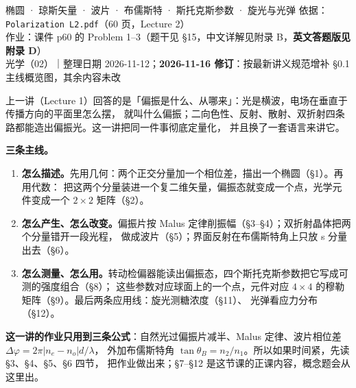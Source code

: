 \documentclass[11pt]{ctexart}
\let\subhdrtheme\subhdr
\renewcommand{\subhdr}[1]{\needspace{4\baselineskip}\subhdrtheme{#1}}
\let\hdrorig\hdr
\renewcommand{\hdr}[2]{\needspace{11\baselineskip}\hdrorig{#1}{#2}}
\begin{document}
{椭圆 · 琼斯矢量 · 波片 · 布儒斯特 · 斯托克斯参数 · 旋光与光弹}
{依据：\texttt{Polarization L2.pdf}（60 页，Lecture 2）\\
作业：课件 p60 的 Problem 1--3（题干见 §15，中文详解见附录 B，\textbf{英文答题版见附录 D}）\\
光学（02）｜整理日期 2026-11-12；\textbf{2026-11-16 修订}：按最新讲义规范增补 §0.1 主线概览图，其余内容未改}


上一讲（Lecture 1）回答的是「偏振是什么、从哪来」：光是横波，电场在垂直于传播方向的平面里怎么摆，
就叫什么偏振；二向色性、反射、散射、双折射四条路都能造出偏振光。这一讲把同一件事彻底定量化，
并且换了一套语言来讲它。

\textbf{三条主线。}

\begin{enumerate}[label=\textbf{\arabic*.},leftmargin=2.0em]
\item \textbf{怎么描述。}先用几何：两个正交分量加一个相位差，描出一个椭圆（§1）。再用代数：
把这两个分量装进一个复二维矢量，偏振态就变成一个点，光学元件变成一个 $2\times2$ 矩阵（§2）。
\item \textbf{怎么产生、怎么改变。}偏振片按 Malus 定律削振幅（§3--§4）；双折射晶体把两个分量错开一段光程，
做成波片（§5）；界面反射在布儒斯特角上只放 s 分量出去（§6）。
\item \textbf{怎么测量、怎么用。}转动检偏器能读出偏振态，四个斯托克斯参数把它写成可测的强度组合（§8）；
这些参数对应球面上的一个点，元件对应 $4\times4$ 的穆勒矩阵（§9）。最后两条应用线：旋光测糖浓度（§11）、
光弹看应力分布（§12）。
\end{enumerate}

\textbf{这一讲的作业只用到三条公式}：自然光过偏振片减半、Malus 定律、波片相位差 $\Delta\varphi=2\pi|n_e-n_o|d/\lambda$，
外加布儒斯特角 $\tan\theta_B=n_2/n_1$。所以如果时间紧，先读 §3、§4、§5、§6 四节，
把作业做出来；§7--§12 是这节课的正课内容，概念题会从这里出。

\end{document}

